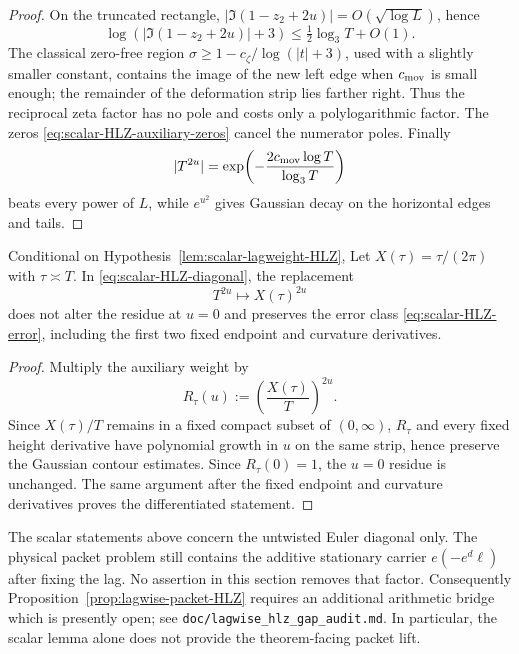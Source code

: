 \begin{proof}
On the truncated rectangle,
$|\Im(1-z_2+2u)|=O(\sqrt{\log L})$, hence
\[
\log(|\Im(1-z_2+2u)|+3)\le\tfrac12\log_3T+O(1).
\]
The classical zero-free region
$\sigma\ge1-c_\zeta/\log(|t|+3)$, used with a slightly smaller constant,
contains the image of the new left edge when $c_{\rm mov}$ is small enough;
the remainder of the deformation strip lies farther right.  Thus the
reciprocal zeta factor has no pole and costs only a polylogarithmic factor.
The zeros \eqref{eq:scalar-HLZ-auxiliary-zeros} cancel the numerator poles.
Finally
\[
|T^{2u}|=\exp\!\left(-\frac{2c_{\rm mov}\log T}{\log_3T}\right)
\]
beats every power of $L$, while $e^{u^2}$ gives Gaussian decay on the
horizontal edges and tails.
\end{proof}

\begin{lemma}
\label{lem:scalar-HLZ-local-height}
Conditional on Hypothesis~\ref{lem:scalar-lagweight-HLZ},
Let $X(\tau)=\tau/(2\pi)$ with $\tau\asymp T$.  In
\eqref{eq:scalar-HLZ-diagonal}, the replacement
\[
T^{2u}\longmapsto X(\tau)^{2u}
\]
does not alter the residue at $u=0$ and preserves the error class
\eqref{eq:scalar-HLZ-error}, including the first two fixed endpoint and
curvature derivatives.
\end{lemma}

\begin{proof}
Multiply the auxiliary weight by
\[
R_\tau(u):=\left(\frac{X(\tau)}T\right)^{2u}.
\]
Since $X(\tau)/T$ remains in a fixed compact subset of $(0,\infty)$,
$R_\tau$ and every fixed height derivative have polynomial growth in $u$ on the
same strip, hence preserve the Gaussian contour estimates.  Since
$R_\tau(0)=1$, the $u=0$ residue is unchanged.  The same argument after the
fixed endpoint and curvature derivatives proves the differentiated statement.
\end{proof}

\begin{remark}
The scalar statements above concern the untwisted Euler diagonal only.  The
physical packet problem still contains the additive stationary carrier
$e(-e^d\ell)$ after fixing the lag.  No assertion in this section removes that
factor.  Consequently Proposition~\ref{prop:lagwise-packet-HLZ} requires an
additional arithmetic bridge which is presently open; see
\texttt{doc/lagwise\_hlz\_gap\_audit.md}.  In particular, the scalar lemma alone
does not provide the theorem-facing packet lift.
\end{remark}
